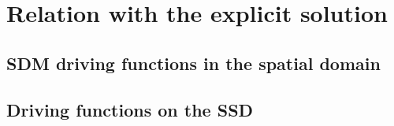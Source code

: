 \section{Relation with the explicit solution}
\subsection{SDM driving functions in the spatial domain}
\subsection{Driving functions on the SSD}
	
%

